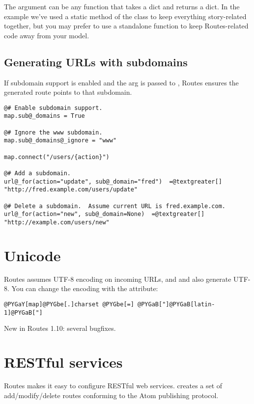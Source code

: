 \documentclass[letterpaper,10pt,english]{manual}
\begin{document}
The  argument can be any function that takes a dict and returns a
dict.  In the example we've used a static method of the  class to keep
everything story-related together, but you may prefer to use a standalone
function to keep Routes-related code away from your model.


\subsection{Generating URLs with subdomains}

If subdomain support is enabled and the  arg is passed to
, Routes ensures the generated route points to that subdomain.

\begin{Verbatim}[commandchars=@\[\]]
@# Enable subdomain support.
map.sub@_domains = True

@# Ignore the www subdomain.
map.sub@_domains@_ignore = "www"

map.connect("/users/{action}")

@# Add a subdomain.
url@_for(action="update", sub@_domain="fred")  =@textgreater[]  "http://fred.example.com/users/update"

@# Delete a subdomain.  Assume current URL is fred.example.com.
url@_for(action="new", sub@_domain=None)  =@textgreater[]  "http://example.com/users/new"
\end{Verbatim}


\section{Unicode}

Routes assumes UTF-8 encoding on incoming URLs, and  and 
also generate UTF-8.  You can change the encoding with the 
attribute:

\begin{Verbatim}[commandchars=@\[\]]
@PYGaY[map]@PYGbe[.]charset @PYGbe[=] @PYGaB["]@PYGaB[latin-1]@PYGaB["]
\end{Verbatim}

New in Routes 1.10: several bugfixes.


\section{RESTful services}

Routes makes it easy to configure RESTful web services.  
creates a set of add/modify/delete routes conforming to the Atom publishing
protocol.
\end{document}
